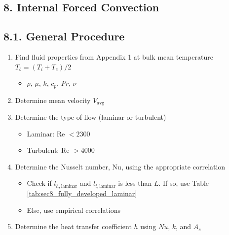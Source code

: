\begin{multicols*}{2}
\section*{8. Internal Forced Convection}
\subsection*{8.1. General Procedure}
\begin{enumerate}
    \item Find fluid properties from Appendix 1 at bulk mean temperature $T_b = (T_i + T_e)/2$
    \begin{itemize}
        \item $\rho$, $\mu$, $k$, $c_p$, $Pr$, $\nu$
    \end{itemize}
    \item Determine mean velocity $V_{\text{avg}}$
    \item Determine the type of flow (laminar or turbulent)
    \begin{itemize}
        \item Laminar: Re $< 2300$
        \item Turbulent: Re $> 4000$
    \end{itemize}
    \item Determine the Nusselt number, Nu, using the appropriate correlation
    \begin{itemize}
        \item Check if $l_{h, \text{laminar}}$ and $l_{t, \text{laminar}}$ is less than $L$. If so, use Table \ref{tab:sec8_fully_developed_laminar} 
        \item Else, use empirical correlations
    \end{itemize}
    \item Determine the heat transfer coefficient $h$ using $Nu$, $k$, and $A_s$
\end{enumerate}


\end{multicols*}
